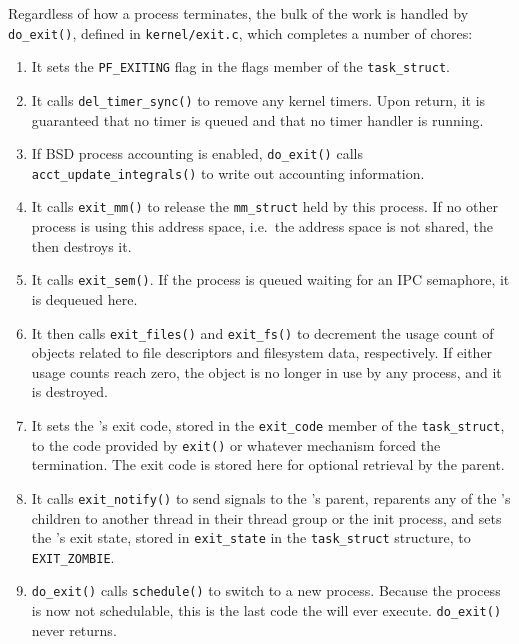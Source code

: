Regardless of how a process terminates, the bulk of the work is handled by \texttt{do_exit()}, defined in \texttt{kernel/exit.c}, which completes a number of chores:
\begin{enumerate}
\item It sets the \texttt{PF_EXITING} flag in the flags member of the \texttt{task_struct}.
\item It calls \texttt{del_timer_sync()} to remove any kernel timers.
  Upon return, it is guaranteed that no timer is queued and that no timer handler is running.
\item If BSD process accounting is enabled, \texttt{do_exit()} calls \texttt{acct_update_integrals()} to write out accounting information.
\item It calls \texttt{exit_mm()} to release the \texttt{mm_struct} held by this process.
  If no other process is using this address space, i.e.\ the address space is not shared, the  then destroys it.
\item It calls \texttt{exit_sem()}.
  If the process is queued waiting for an IPC semaphore, it is dequeued here.
\item It then calls \texttt{exit_files()} and \texttt{exit_fs()} to decrement the usage count of objects related to file descriptors and filesystem data, respectively.
  If either usage counts reach zero, the object is no longer in use by any process, and it is destroyed.
\item It sets the ’s exit code, stored in the \texttt{exit_code} member of the \texttt{task_struct}, to the code provided by \texttt{exit()} or whatever  mechanism forced the termination.
  The exit code is stored here for optional retrieval by the parent.
\item It calls \texttt{exit_notify()} to send signals to the ’s parent, reparents any of the ’s children to another thread in their thread group or the init process, and sets the ’s exit state, stored in \texttt{exit_state} in the \texttt{task_struct} structure, to \texttt{EXIT_ZOMBIE}.
\item \texttt{do_exit()} calls \texttt{schedule()} to switch to a new process.
  Because the process is now not schedulable, this is the last code the  will ever execute.
  \texttt{do_exit()} never returns.
\end{enumerate}


